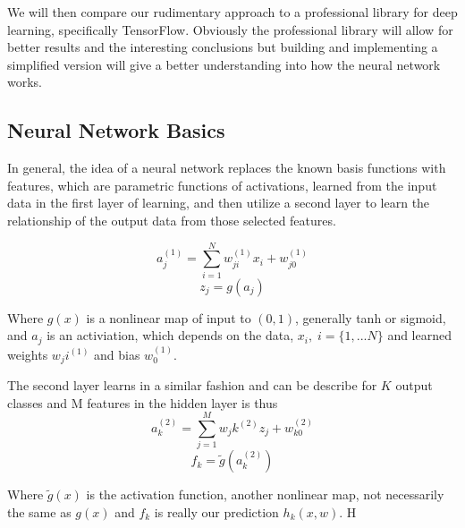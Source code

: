 \documentclass[12pt, twocolumn]{article}
\begin{document}
 We will then compare our rudimentary approach to a professional library for deep learning, specifically TensorFlow. Obviously the professional library will allow for better results and the interesting conclusions but building and implementing a simplified version will give a better understanding into how the neural network works. 

\subsection{Neural Network Basics}

In general, the idea of a neural network replaces the known basis functions with features, which are parametric functions of activations, learned from the input data in the first layer of learning, and then utilize a second layer to learn the relationship of the output data from those selected features.

\begin{equation}
a_j^{(1)}= \sum_{i=1}^N w_{ji}^{(1)} x_i+w_{j0}^{(1)}
\end{equation}
\begin{equation}
z_j= g(a_j)
\end{equation}

Where $g(x)$ is a nonlinear map of input to $(0,1)$, generally tanh or sigmoid, and $a_j$ is an activiation, which depends on the data, $x_i, \; i=\{1,...N\}$  and learned weights $w_ji^{(1)}$ and bias $w_0^{(1)}$. 

The second layer learns in a similar fashion and can be describe for $K$ output classes and M features in the  hidden layer  is thus 
\begin{equation}
a_k^{(2)}= \sum_{j=1}^M w_jk^{(2)} z_j+w_{k0}^{(2)}
\end{equation}
\begin{equation}
f_k= \tilde{g}(a_k^{(2)})
\end{equation}
 
Where $\tilde{g}(x)$ is the activation function, another nonlinear map, not necessarily the same as $g(x)$ and $f_k$ is really our prediction $h_k(x,w)$. H
\end{document}
